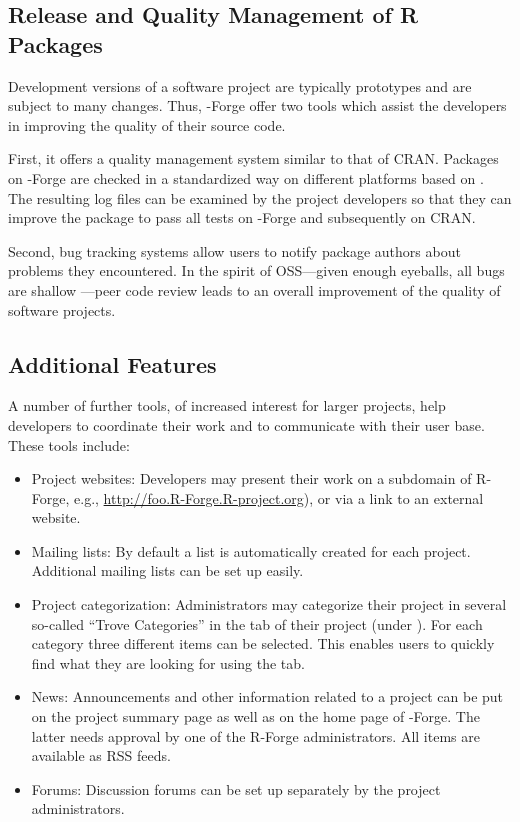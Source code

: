 \subsection{Release and Quality Management of R Packages}
\label{sec:release_and_quality_management}

Development versions of a software project are typically
prototypes and are subject to many changes. Thus, \R{}-Forge offer
two tools which assist the developers in improving the quality of
their source code.

First, it offers a quality management system similar to 
that of CRAN. Packages on \R{}-Forge are checked in a
standardized way on different platforms based on
. The resulting log files can be examined by the
project developers so that they can improve
the package to pass all tests on \R{}-Forge and subsequently on CRAN.

Second, bug tracking systems allow users to notify
package authors about problems they encountered. In the spirit of
OSS---given enough eyeballs, all bugs are shallow
\citep{forge:Raymond:1999}---peer code review leads to an 
overall improvement of the quality of software projects.

\subsection{Additional Features}

A number of further tools, of increased interest for larger
projects, help developers to coordinate their work and to communicate
with their user base. These tools include:

\begin{itemize}
\item Project websites: Developers may present their work
  on a subdomain of R-Forge, e.g.,
  \url{http://foo.R-Forge.R-project.org}), or via a link to an
  external website.
\item Mailing lists: By default a list
   is automatically
  created for each project. Additional mailing lists can be
  set up easily.
\item Project categorization: Administrators may categorize their
  project in several so-called ``Trove Categories'' in the 
  tab of their project (under ). For each
  category three different items can be selected. This enables users
  to quickly find what they are looking for using the 
  tab.
\item News: Announcements and other information related to a project
  can be put on the project summary page as well as on the 
  home page of \R{}-Forge. The latter needs approval by one of the R-Forge
  administrators. All items are available as RSS feeds.
\item Forums: Discussion forums can be set up separately by the
  project administrators.%
\end{itemize}

